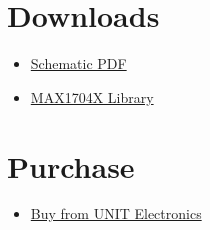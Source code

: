 \documentclass[10pt]{article}
\begin{document}
\section*{Downloads}
\begin{itemize}
\begin{itemize}
\item \href{docs/schematic.pdf}{Schematic PDF}
\item \href{https://github.com/UNIT-Electronics/MAX1704X_lib}{MAX1704X Library}
\end{itemize}
\end{itemize}

\section*{Purchase}
\begin{itemize}
\item \href{https://www.uelectronics.com}{Buy from UNIT Electronics}
\end{itemize}
\end{document}
